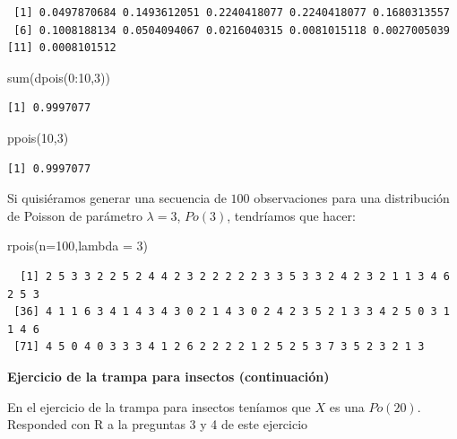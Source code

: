 \documentclass[
  letterpaper,
  DIV=11,
  numbers=noendperiod]{scrreprt}
\newenvironment{Shaded}{\begin{snugshade}}{\end{snugshade}}
\newcommand{\AttributeTok}[1]{\textcolor[rgb]{0.40,0.45,0.13}{#1}}
\newcommand{\DecValTok}[1]{\textcolor[rgb]{0.68,0.00,0.00}{#1}}
\newcommand{\FunctionTok}[1]{\textcolor[rgb]{0.28,0.35,0.67}{#1}}
\newcommand{\NormalTok}[1]{\textcolor[rgb]{0.00,0.23,0.31}{#1}}
\newcommand{\SpecialCharTok}[1]{\textcolor[rgb]{0.37,0.37,0.37}{#1}}
\begin{document}
\begin{verbatim}
 [1] 0.0497870684 0.1493612051 0.2240418077 0.2240418077 0.1680313557
 [6] 0.1008188134 0.0504094067 0.0216040315 0.0081015118 0.0027005039
[11] 0.0008101512
\end{verbatim}

\begin{Shaded}
\begin{Highlighting}[]
\FunctionTok{sum}\NormalTok{(}\FunctionTok{dpois}\NormalTok{(}\DecValTok{0}\SpecialCharTok{:}\DecValTok{10}\NormalTok{,}\DecValTok{3}\NormalTok{))}
\end{Highlighting}
\end{Shaded}

\begin{verbatim}
[1] 0.9997077
\end{verbatim}

\begin{Shaded}
\begin{Highlighting}[]
\FunctionTok{ppois}\NormalTok{(}\DecValTok{10}\NormalTok{,}\DecValTok{3}\NormalTok{)}
\end{Highlighting}
\end{Shaded}

\begin{verbatim}
[1] 0.9997077
\end{verbatim}

Si quisiéramos generar una secuencia de \(100\) observaciones para una
distribución de Poisson de parámetro \(\lambda=3\), \(Po(3)\),
tendríamos que hacer:

\begin{Shaded}
\begin{Highlighting}[]
\FunctionTok{rpois}\NormalTok{(}\AttributeTok{n=}\DecValTok{100}\NormalTok{,}\AttributeTok{lambda =} \DecValTok{3}\NormalTok{)}
\end{Highlighting}
\end{Shaded}

\begin{verbatim}
  [1] 2 5 3 3 2 2 5 2 4 4 2 3 2 2 2 2 2 3 3 5 3 3 2 4 2 3 2 1 1 3 4 6 2 5 3
 [36] 4 1 1 6 3 4 1 4 3 4 3 0 2 1 4 3 0 2 4 2 3 5 2 1 3 3 4 2 5 0 3 1 1 4 6
 [71] 4 5 0 4 0 3 3 3 4 1 2 6 2 2 2 2 1 2 5 2 5 3 7 3 5 2 3 2 1 3
\end{verbatim}

\textbf{Ejercicio de la trampa para insectos (continuación)}

En el ejercicio de la trampa para insectos teníamos que \(X\) es una
\(Po(20)\). Responded con R a la preguntas 3 y 4 de este ejercicio
\end{document}
